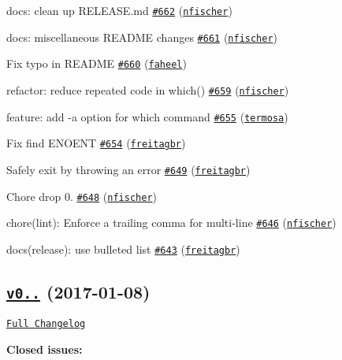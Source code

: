 \begin{DoxyItemize}
\item docs\+: clean up R\+E\+L\+E\+A\+S\+E.\+md \href{https://github.com/shelljs/shelljs/pull/662}{\tt \#662} (\href{https://github.com/nfischer}{\tt nfischer})
\item docs\+: miscellaneous R\+E\+A\+D\+ME changes \href{https://github.com/shelljs/shelljs/pull/661}{\tt \#661} (\href{https://github.com/nfischer}{\tt nfischer})
\item Fix typo in R\+E\+A\+D\+ME \href{https://github.com/shelljs/shelljs/pull/660}{\tt \#660} (\href{https://github.com/faheel}{\tt faheel})
\item refactor\+: reduce repeated code in which() \href{https://github.com/shelljs/shelljs/pull/659}{\tt \#659} (\href{https://github.com/nfischer}{\tt nfischer})
\item feature\+: add -\/a option for which command \href{https://github.com/shelljs/shelljs/pull/655}{\tt \#655} (\href{https://github.com/termosa}{\tt termosa})
\item Fix find E\+N\+O\+E\+NT \href{https://github.com/shelljs/shelljs/pull/654}{\tt \#654} (\href{https://github.com/freitagbr}{\tt freitagbr})
\item Safely exit by throwing an error \href{https://github.com/shelljs/shelljs/pull/649}{\tt \#649} (\href{https://github.com/freitagbr}{\tt freitagbr})
\item Chore drop 0. \href{https://github.com/shelljs/shelljs/pull/648}{\tt \#648} (\href{https://github.com/nfischer}{\tt nfischer})
\item chore(lint)\+: Enforce a trailing comma for multi-\/line \href{https://github.com/shelljs/shelljs/pull/646}{\tt \#646} (\href{https://github.com/nfischer}{\tt nfischer})
\item docs(release)\+: use bulleted list \href{https://github.com/shelljs/shelljs/pull/643}{\tt \#643} (\href{https://github.com/freitagbr}{\tt freitagbr})
\end{DoxyItemize}

\subsection*{\href{https://github.com/shelljs/shelljs/tree/v0.7.6}{\tt v0..} (2017-\/01-\/08)}

\href{https://github.com/shelljs/shelljs/compare/v0.7.5...v0.7.6}{\tt Full Changelog}

{\bfseries Closed issues\+:}


